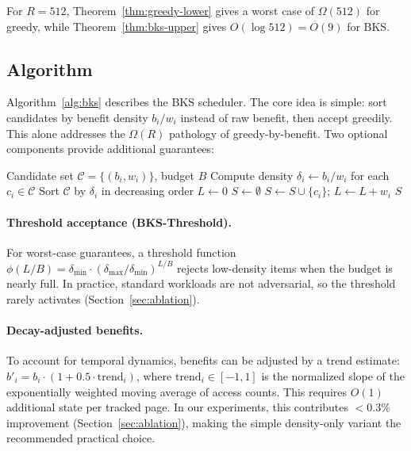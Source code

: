 \documentclass{article}
\newcommand{\bw}{B}
\newcommand{\benefit}{b}
\newcommand{\cost}{w}
\begin{document}
For $R = 512$, Theorem~\ref{thm:greedy-lower} gives a worst case of $\Omega(512)$ for greedy, while Theorem~\ref{thm:bks-upper} gives $O(\log 512) = O(9)$ for BKS.

\subsection{Algorithm}
\label{sec:algorithm}

Algorithm~\ref{alg:bks} describes the BKS scheduler. The core idea is simple: sort candidates by benefit density $\benefit_i / \cost_i$ instead of raw benefit, then accept greedily. This alone addresses the $\Omega(R)$ pathology of greedy-by-benefit. Two optional components provide additional guarantees:

\begin{algorithm}[t]
\caption{BKS Migration Scheduler (per epoch)}
\label{alg:bks}
\begin{algorithmic}[1]
\REQUIRE Candidate set $\mathcal{C} = \{(b_i, w_i)\}$, budget $B$
\STATE Compute density $\delta_i \leftarrow b_i / w_i$ for each $c_i \in \mathcal{C}$
\STATE Sort $\mathcal{C}$ by $\delta_i$ in decreasing order
\STATE $L \leftarrow 0$ 
\STATE $S \leftarrow \emptyset$ 
        \STATE $S \leftarrow S \cup \{c_i\}$; $L \leftarrow L + w_i$
    \ENDIF
\ENDFOR
\RETURN $S$
\end{algorithmic}
\end{algorithm}

\paragraph{Threshold acceptance (BKS-Threshold).} For worst-case guarantees, a threshold function $\phi(L/\bw) = \delta_{\min} \cdot (\delta_{\max}/\delta_{\min})^{L/\bw}$ rejects low-density items when the budget is nearly full. In practice, standard workloads are not adversarial, so the threshold rarely activates (Section~\ref{sec:ablation}).

\paragraph{Decay-adjusted benefits.} To account for temporal dynamics, benefits can be adjusted by a trend estimate: $\benefit'_i = \benefit_i \cdot (1 + 0.5 \cdot \text{trend}_i)$, where $\text{trend}_i \in [-1, 1]$ is the normalized slope of the exponentially weighted moving average of access counts. This requires $O(1)$ additional state per tracked page. In our experiments, this contributes $<0.3\%$ improvement (Section~\ref{sec:ablation}), making the simple density-only variant the recommended practical choice.
\end{document}
